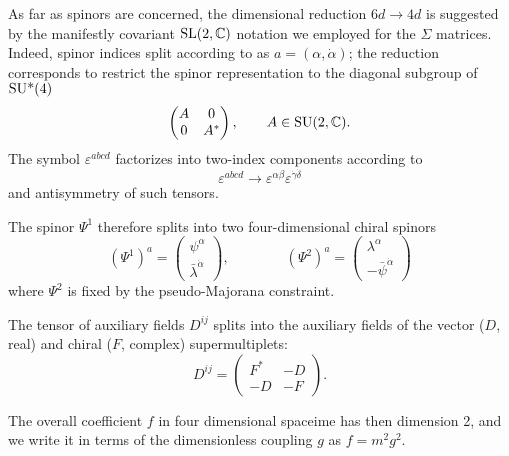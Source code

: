 As far as spinors are concerned, the dimensional reduction \( 6d \rightarrow 4d \) is suggested by the manifestly covariant \( { \text{SL} }(2,\mathbb{C}) \) notation we employed for the $\Sigma$ matrices. Indeed, spinor indices split according to as $a=(\alpha, \dot \alpha)$; the reduction corresponds to restrict the spinor representation to the diagonal subgroup of ${ \text{SU*} }(4)$ 
\begin{equation}
\begin{pmatrix}
A & 0 \\
0 & A^*
\end{pmatrix},
\qquad
A \in { \text{SU} }(2,\mathbb{C}).
\end{equation}
The symbol $\varepsilon^{abcd}$ factorizes into two-index components according to
\begin{equation}
\varepsilon^{abcd} \rightarrow \varepsilon^{\alpha \beta} \varepsilon^{\dot \gamma \dot \delta}
\end{equation}
and antisymmetry of such tensors.




The spinor  $\Psi^1$ therefore splits into two four-dimensional chiral spinors 
\begin{equation}
(\Psi^1)^a = 
\begin{pmatrix}
\psi^\alpha \\
\bar \lambda ^{\dot{\alpha}}
\end{pmatrix},
\qquad\qquad
(\Psi^2)^a = 
\begin{pmatrix}
\lambda^{\alpha}\\
- \bar \psi^{\dot{\alpha}}
\end{pmatrix}
\end{equation}
where \( \Psi^2 \) is fixed by the pseudo-Majorana constraint.


The tensor of auxiliary fields $D^{ij}$ splits into the auxiliary fields of the vector ($D$, real) and chiral ($F$, complex) supermultiplets:
\begin{equation}\label{dim-red-Dij}
	D^{ij} 
		=
	\begin{pmatrix}
		F^*	&	-D \\
		- D	&	- F	
	\end{pmatrix}.
\end{equation}


The overall coefficient $f$ in four dimensional spaceime has then dimension 2, and we write it in terms of the dimensionless \ym{} coupling $g$ as  $f = m^2 g^2$.

